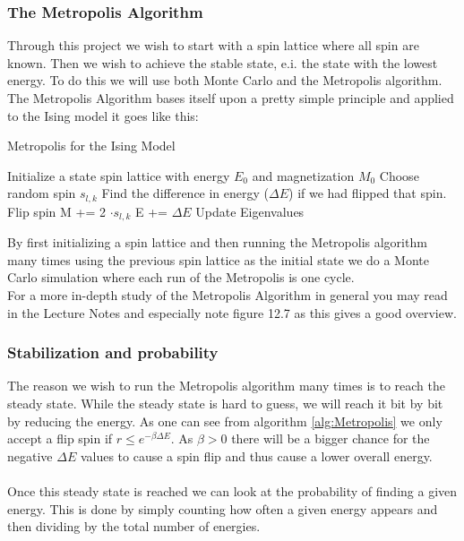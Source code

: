 \documentclass{article}
\begin{document}
\subsubsection*{The Metropolis Algorithm}
Through this project we wish to start with a spin lattice where all spin are known. Then we wish to achieve the stable state, e.i. the state with the lowest energy. To do this we will use both Monte Carlo and the Metropolis algorithm. The Metropolis Algorithm bases itself upon a pretty simple principle and applied to the Ising model it goes like this: \\
\begin{algorithm}[H]
\small
\caption{Metropolis for the Ising Model}\label{alg:Metropolis}
\begin{algorithmic}[1]
\State Initialize a state spin lattice with energy $E_0$ and magnetization $M_0$ 
 
\State Choose random spin $s_{l,k}$
\State Find the difference in energy ($\Delta E$) if we had flipped that spin.
 
\State Flip spin
\State M += 2 $\cdot s_{l,k}$
\State E += $\Delta E$
\EndIf
\EndFor
\EndFor
\State Update Eigenvalues
\end{algorithmic}
\end{algorithm}
By first initializing a spin lattice and then running the Metropolis algorithm many times using the previous spin lattice as the initial state we do a Monte Carlo simulation where each run of the Metropolis is one cycle. \\
For a more in-depth study of the Metropolis Algorithm in general you may read in the Lecture Notes and especially note figure 12.7 as this gives a good overview. \cite{lectures}
\subsubsection*{Stabilization and probability}
The reason we wish to run the Metropolis algorithm many times is to reach the steady state. While the steady state is hard to guess, we will reach it bit by bit by reducing the energy. As one can see from algorithm \ref{alg:Metropolis} we only accept a flip spin if $r \leq e^{-\beta \Delta E}$. As $\beta > 0$ there will be a bigger chance for the negative $\Delta E$ values to cause a spin flip and thus cause a lower overall energy. \\ \\
Once this steady state is reached we can look at the probability of finding a given energy. This is done by simply counting how often a given energy appears and then dividing by the total number of energies.
\end{document}
